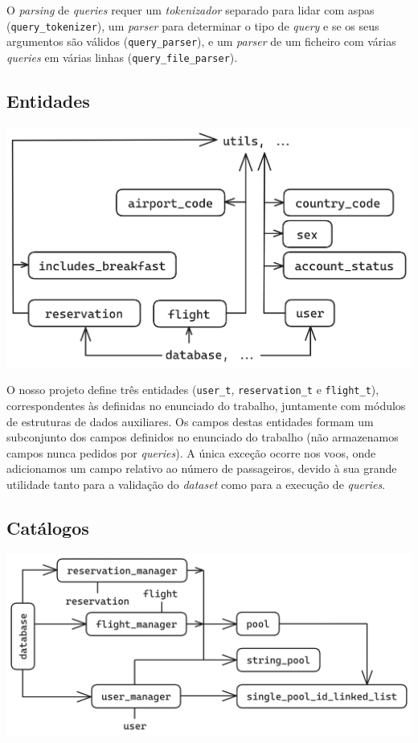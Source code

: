 \documentclass[12pt, a4paper]{article}
\begin{document}
O \emph{parsing} de \emph{queries} requer um \emph{tokenizador} separado para lidar com aspas
(\texttt{query\_tokenizer}), um \emph{parser} para determinar o tipo de \emph{query} e se os seus
argumentos são válidos (\texttt{query\_parser}), e um \emph{parser} de um ficheiro com várias
\emph{queries} em várias linhas (\texttt{query\_file\_parser}).

\subsection{Entidades}

\begin{center}
    \includegraphics[scale=0.2]{res/entities.png}
\end{center}

O nosso projeto define três entidades (\texttt{user\_t}, \texttt{reservation\_t} e
\texttt{flight\_t}), correspondentes às definidas no enunciado do trabalho, juntamente com módulos
de estruturas de dados auxiliares. Os campos destas entidades formam um subconjunto dos campos
definidos no enunciado do trabalho (não armazenamos campos nunca pedidos por \emph{queries}). A
única exceção ocorre nos voos, onde adicionamos um campo relativo ao número de passageiros, devido
à sua grande utilidade tanto para a validação do \emph{dataset} como para a execução de
\emph{queries}.

\subsection{Catálogos}

\begin{center}
    \includegraphics[scale=0.19]{res/database.png}
\end{center}
\end{document}
